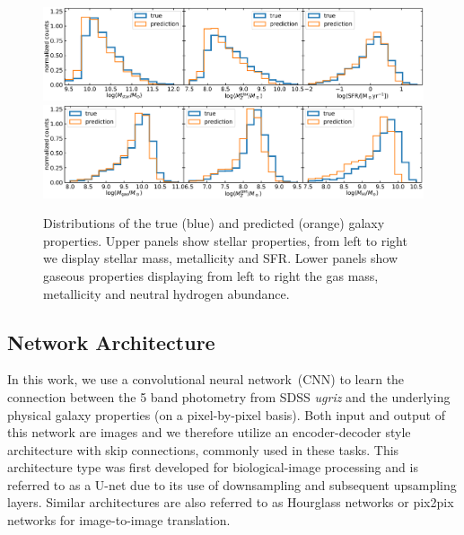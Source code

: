 \documentclass[useAMS,usenatbib]{mnras}
\begin{document}
\begin{figure}
\begin{center}
\includegraphics[width=\textwidth]{./plots/star_hist_2rh_masked_ugriz.pdf}
\includegraphics[width=\textwidth]{./plots/gas_hist_2rh_masked_ugriz.pdf}
\end{center}
\vspace{-.35cm}
\caption{Distributions of the true (blue) and predicted (orange) galaxy properties. Upper panels show stellar properties, from left to right we display stellar mass, metallicity and SFR. Lower panels show gaseous properties displaying from left to right the gas mass, metallicity and neutral hydrogen abundance.}
\label{fig:hist}
\end{figure}


\subsection{Network Architecture}

In this work, we use a convolutional neural network~(CNN) to learn the connection between the 5 band photometry from SDSS \textit{ugriz} and the underlying physical galaxy properties (on a pixel-by-pixel basis). Both input and output of this network are images and we therefore utilize an encoder-decoder style architecture with skip connections, commonly used in these tasks. This architecture type was first developed for biological-image  processing\citep{Ronneberger2015} and is referred to as a U-net due to its use of downsampling and subsequent upsampling layers. Similar architectures are also referred to as Hourglass networks \cite{newell2016stacked} or pix2pix networks \cite{isola2017image} for image-to-image translation.
\end{document}

